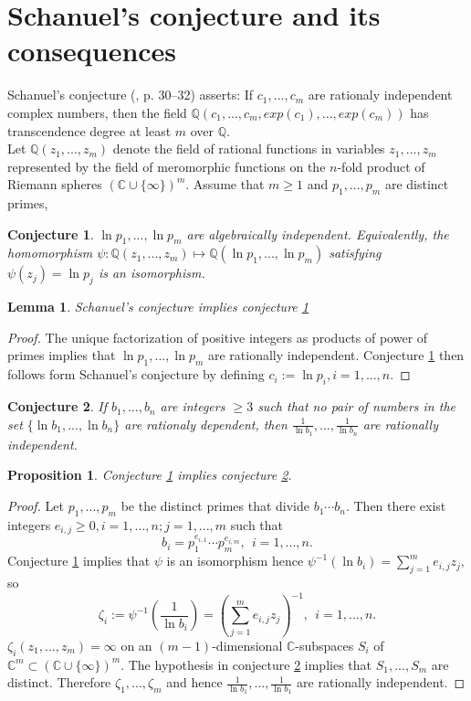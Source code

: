 \documentclass[14pt, twoside, a4paper]{article} %
\newtheorem{conj}{Conjecture}
\newtheorem{lem}{Lemma}                                                    %
\newtheorem{prop}{Proposition}                                             %
\newtheorem{proof}{Proof}                                              %
\begin{document}
\section{Schanuel's conjecture and its consequences}\label{sec3}
%
Schanuel's conjecture (\cite{lang}, p. 30--32) asserts:
%
If $c_1,...,c_m$ are rationaly independent complex numbers, 
then the field
$\mathbb Q(c_1,...,c_m, exp(c_1),...,exp(c_m))$ 
has transcendence degree at least $m$ over 
$\mathbb Q.$ 
%
\newline
\\
Let $\mathbb Q(z_1,...,z_m)$ denote the field of rational functions in variables $z_1,...,z_m$ represented by the field of meromorphic functions on the
$n$-fold product of Riemann spheres $(\mathbb C \cup \{\infty\})^m.$
Assume that $m \geq 1$ and $p_1,...,p_m$ are distinct primes,
%
\begin{conj}\label{conj1}
 $\ln p_1,...,\ln p_m$ are algebraically independent.
Equivalently, the homomorphism 
$\psi : \mathbb Q(z_1,...,z_m) \mapsto \mathbb Q(\ln p_1,...,\ln p_m)$ 
satisfying $\psi(z_j) = \ln p_j$ is an isomorphism.
\end{conj}
%
\begin{lem}\label{lem3}
Schanuel's conjecture implies conjecture \ref{conj1} 
\end{lem}
\begin{proof}
The  unique factorization of positive integers 
as products of power of primes implies that 
$\ln p_1,...,\ln p_m$ are rationally independent.
Conjecture \ref{conj1} then follows form
Schanuel's conjecture by
defining $c_i := \ln p_i, i = 1,...,n.$
\end{proof}
%
\begin{conj}\label{conj2}
If $b_1,...,b_n$ are integers $\geq 3$
such that no pair of numbers in the set 
$\{\ln b_1,...,\ln b_n\}$ 
are rationaly dependent, then 
$\frac{1}{\ln b_1},...,\frac{1}{\ln b_n}$ 
are rationally independent.
\end{conj}
%
\begin{prop}\label{prop1}
Conjecture \ref{conj1} implies conjecture \ref{conj2}. 
\end{prop}
\begin{proof}
Let $p_1,...,p_m$ be the distinct primes that divide $b_1 \cdots b_n.$
Then there exist integers $e_{i,j} \geq 0, i = 1,...,n; j = 1,...,m$ such that
%
\begin{equation}\label{eq7}
 b_i = p_1^{e_{i,1}} \cdots p_m^{e_{i,m}}, \ \ i = 1,...,n.
\end{equation}
%
Conjecture \ref{conj1} implies that $\psi$ is an isomorphism hence 
$\psi^{-1}(\ln b_i) = \sum_{j = 1}^m e_{i,j} z_j,$ so
%
\begin{equation}\label{eq8}
 \zeta_i := \psi^{-1}\left(\frac{1}{\ln b_i}\right) = 
\left( \sum_{j = 1}^m e_{i,j} z_j \right)^{-1}, \ \ i = 1,...,n.
\end{equation}
%
$\zeta_i(z_1,...,z_m) = \infty$ on an
$(m-1)$-dimensional $\mathbb C$-subspaces $S_i$ of 
$\mathbb C^m \subset (\mathbb C \cup \{\infty\})^m.$
The hypothesis in conjecture \ref{conj2} implies that 
$S_1,...,S_m$ are distinct. Therefore 
$\zeta_1,...,\zeta_m$
and hence
$\frac{1}{\ln b_1},..., \frac{1}{\ln b_1}$
are rationally independent.
\end{proof}
%
\end{document}
